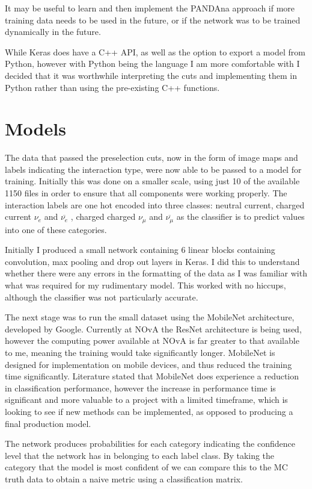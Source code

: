 \documentclass[11pt]{article}
\begin{document}
It may be useful to learn and then implement the PANDAna approach if more training data needs to be used in the future, or if the network was to be trained dynamically in the future.

While Keras does have a C++ API, as well as the option to export a model from Python, however with Python being the language I am more comfortable with I decided that it was worthwhile interpreting the cuts and implementing them in Python rather than using the pre-existing C++ functions.


\section*{Models}

The data that passed the preselection cuts, now in the form of image maps and labels indicating the interaction type, were now able to be passed to a model for training. Initially this was done on a smaller scale, using just 10 of the available 1150 files in order to ensure that all components were working properly. The interaction labels are one hot encoded into three classes: neutral current, charged current  $\nu_e$  and  $\overline{\nu_e}$ , charged charged  $\nu_\mu$  and  $\overline{\nu_\mu}$ as the classifier is to predict values into one of these categories.

Initially I produced a small network containing 6 linear blocks containing convolution, max pooling and drop out layers in Keras. I did this to understand whether there were any errors in the formatting of the data as I was familiar with what was required for my rudimentary model. This worked with no hiccups, although the classifier was not particularly accurate. 

The next stage was to run the small dataset using the MobileNet architecture, developed by Google. Currently at NOvA the ResNet architecture is being used, however the computing power available at NOvA is far greater to that available to me, meaning the training would take significantly longer. MobileNet is designed for implementation on mobile devices, and thus reduced the training time significantly. Literature stated that MobileNet does experience a reduction in classification performance, however the increase in performance time is significant and more valuable to a project with a limited timeframe, which is looking to see if new methods can be implemented, as opposed to producing a final production model.

The network produces probabilities for each category indicating the confidence level that the network has in belonging to each label class. By taking the category that the model is most confident of we can compare this to the MC truth data to obtain a naive metric using a classification matrix. 
\end{document}
